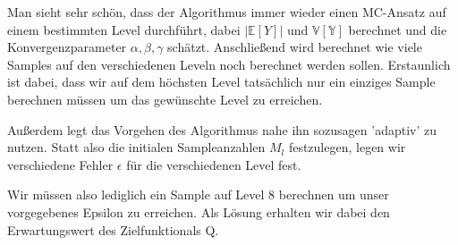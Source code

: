 Man sieht sehr schön, dass der Algorithmus immer wieder einen MC-Ansatz auf einem bestimmten Level durchführt, dabei $| \mathbb{E}[Y] |$ und $\mathbb{V[Y]}$ berechnet und die Konvergenzparameter $\alpha , \beta, \gamma$ schätzt. Anschließend wird berechnet wie viele Samples auf den verschiedenen Leveln noch berechnet werden sollen. 
Erstaunlich ist dabei, dass wir auf dem höchsten Level tatsächlich nur ein einziges Sample berechnen müssen um das gewünschte Level zu erreichen.
\begin{figure}[H]
	\centering
\end{figure}
Außerdem legt das Vorgehen des Algorithmus nahe ihn sozusagen 'adaptiv' zu nutzen. Statt also die initialen Sampleanzahlen $M_l$ festzulegen, legen wir verschiedene Fehler $\epsilon$ für die verschiedenen Level fest.
\begin{figure}[H]
	\centering
\end{figure}
\begin{figure}[H]
	\centering
\end{figure}
Wir müssen also lediglich ein Sample auf Level 8 berechnen um unser vorgegebenes Epsilon zu erreichen.
Als Lösung erhalten wir dabei den Erwartungswert des Zielfunktionals Q.

 





			
